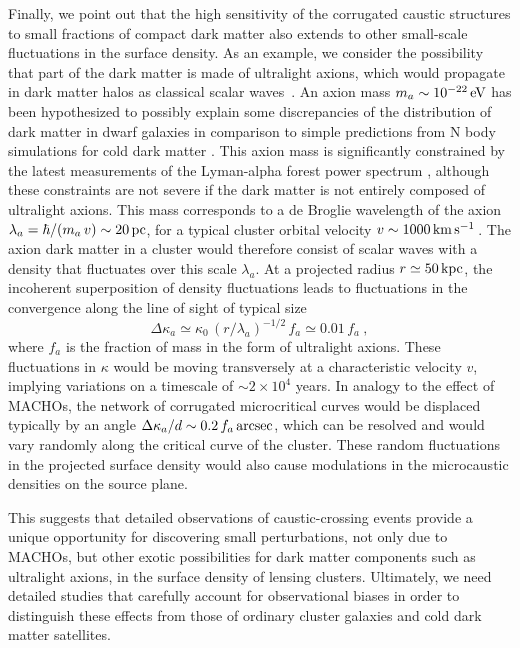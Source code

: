 \documentclass{aastex6}
\def\kms{\, {\rm km}\, {\rm s}^{-1}\, }
\begin{document}
Finally, we point out that the high sensitivity of the corrugated caustic structures to small fractions of compact dark matter also extends to other small-scale fluctuations in the surface density. As an example, we consider the possibility that part of the dark matter is made of ultralight axions, which would propagate in dark matter halos as classical scalar waves~\citep{PhysRevLett.85.1158, Schive:2014dra, Hui:2016ltb}. An axion mass $m_a\sim 10^{-22}\, {\rm eV}$ has been hypothesized to possibly explain some discrepancies of the distribution of dark matter in dwarf galaxies in comparison to simple predictions from N body simulations for cold dark matter \citep{2016MNRAS.460.4397C, 2016JCAP...07..048U}. This axion mass is significantly constrained by the latest measurements of the Lyman-alpha forest power spectrum \citep{2017arXiv170304683I}, although these constraints are not severe if the dark matter is not entirely composed of ultralight axions. 
This mass corresponds to a de Broglie wavelength of
the axion $\lambda_a = \hbar/(m_a\, v) \sim 20\, {\rm pc}$, for a typical cluster orbital velocity $v\sim 1000 \kms$. The axion dark matter in a cluster would therefore consist of scalar waves with a density that fluctuates over this scale $\lambda_a$. At a projected radius $r\simeq 50\, {\rm kpc}$, the incoherent superposition of density fluctuations leads to fluctuations in the convergence along the line of
sight of typical size
\begin{equation}
 \Delta\kappa_a \simeq \kappa_0\, (r/\lambda_a)^{-1/2}\,f_a \simeq 0.01\,f_a ~,
\end{equation}
where $f_a$ is the fraction of mass in the form of ultralight axions. These fluctuations in $\kappa$ would be moving transversely at a characteristic velocity $v$, implying variations on a timescale of $\sim 2\times 10^4$ years. In analogy to the effect of MACHOs, the network of corrugated microcritical curves would be displaced typically by an angle $\Delta\kappa_a/d \sim 0.2\,f_a\, {\rm arcsec}$, which can be resolved and would vary randomly along the critical curve of the cluster. These random fluctuations in the projected surface density would also cause modulations in the microcaustic densities on the source plane.

This suggests that detailed observations of caustic-crossing events provide a unique opportunity for discovering small perturbations, not only due to MACHOs, but other exotic possibilities for dark matter components such as ultralight axions, in the surface density of lensing clusters. Ultimately, we need detailed studies that carefully account for observational biases in order to distinguish these effects from those of ordinary cluster galaxies and cold dark matter satellites.
\end{document}

